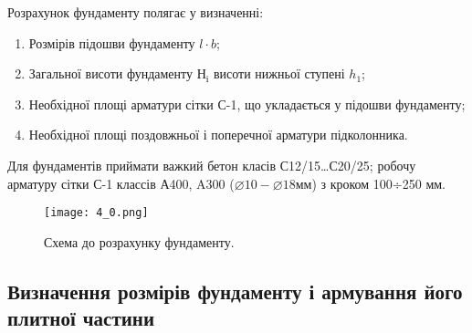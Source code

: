 \documentclass[a4paper,14pt]{article}
\begin{document}
Розрахунок фундаменту полягає у визначенні:
\begin{enumerate}

\item Розмірів підошви фундаменту $l \cdot b$;

\item Загальної висоти фундаменту $Н_і$ висоти нижньої ступені $h_1$;

\item Необхідної площі арматури сітки С-1, що укладається у підошви фундаменту;

\item Необхідної площі поздовжньої і поперечної арматури підколонника.
\end{enumerate}
    Для фундаментів приймати важкий бетон класів С12/15…С20/25; робочу арматуру сітки С-1 классів А400, A300 ($\varnothing10-\varnothing18 \textit{мм}$) з кроком 100÷250 мм.
   
    \begin{figure}[h!]
        \begin{center}
            \texttt{[image: 4\_0.png]}
            \caption{Схема до розрахунку фундаменту.}\label{ris4_0} 
        \end{center}
    \end{figure} 
\subsection{Визначення розмірів фундаменту і армування його плитної частини}
\end{document}
